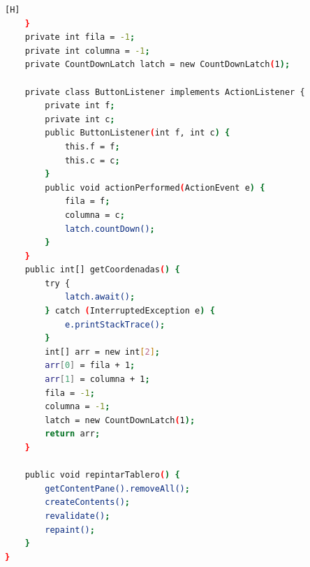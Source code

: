 \documentclass{article}
\begin{document}
\begin{lstlisting}[language=bash,caption={CLASE Tablero}][H]
    }
    private int fila = -1;
    private int columna = -1;
    private CountDownLatch latch = new CountDownLatch(1);

    private class ButtonListener implements ActionListener {
        private int f;
        private int c;
        public ButtonListener(int f, int c) {
            this.f = f;
            this.c = c;
        }
        public void actionPerformed(ActionEvent e) {
            fila = f;
            columna = c;
            latch.countDown(); 
        }
    }
    public int[] getCoordenadas() {
        try {
            latch.await(); 
        } catch (InterruptedException e) {
            e.printStackTrace();
        }
        int[] arr = new int[2];
        arr[0] = fila + 1;
        arr[1] = columna + 1;
        fila = -1;
        columna = -1;
        latch = new CountDownLatch(1);
        return arr;
    }

    public void repintarTablero() {
        getContentPane().removeAll(); 
        createContents(); 
        revalidate(); 
        repaint();
    }
}
	\end{lstlisting}		
	
	
	
\end{document}
